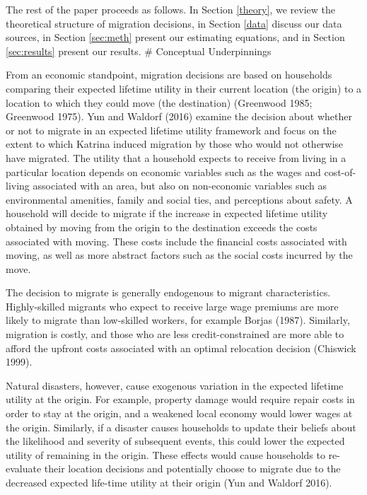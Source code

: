 \documentclass[]{article}
\begin{document}
The rest of the paper proceeds as follows. In Section \ref{theory}, we
review the theoretical structure of migration decisions, in Section
\ref{data} discuss our data sources, in Section \ref{sec:meth} present
our estimating equations, and in Section \ref{sec:results} present our
results. \# Conceptual Underpinnings \label{theory}

From an economic standpoint, migration decisions are based on households
comparing their expected lifetime utility in their current location (the
origin) to a location to which they could move (the destination)
(Greenwood 1985; Greenwood 1975). Yun and Waldorf (2016) examine the
decision about whether or not to migrate in an expected lifetime utility
framework and focus on the extent to which Katrina induced migration by
those who would not otherwise have migrated. The utility that a
household expects to receive from living in a particular location
depends on economic variables such as the wages and cost-of-living
associated with an area, but also on non-economic variables such as
environmental amenities, family and social ties, and perceptions about
safety. A household will decide to migrate if the increase in expected
lifetime utility obtained by moving from the origin to the destination
exceeds the costs associated with moving. These costs include the
financial costs associated with moving, as well as more abstract factors
such as the social costs incurred by the move.

The decision to migrate is generally endogenous to migrant
characteristics. Highly-skilled migrants who expect to receive large
wage premiums are more likely to migrate than low-skilled workers, for
example Borjas (1987). Similarly, migration is costly, and those who are
less credit-constrained are more able to afford the upfront costs
associated with an optimal relocation decision (Chiswick 1999).

Natural disasters, however, cause exogenous variation in the expected
lifetime utility at the origin. For example, property damage would
require repair costs in order to stay at the origin, and a weakened
local economy would lower wages at the origin. Similarly, if a disaster
causes households to update their beliefs about the likelihood and
severity of subsequent events, this could lower the expected utility of
remaining in the origin. These effects would cause households to
re-evaluate their location decisions and potentially choose to migrate
due to the decreased expected life-time utility at their origin (Yun and
Waldorf 2016).
\end{document}
